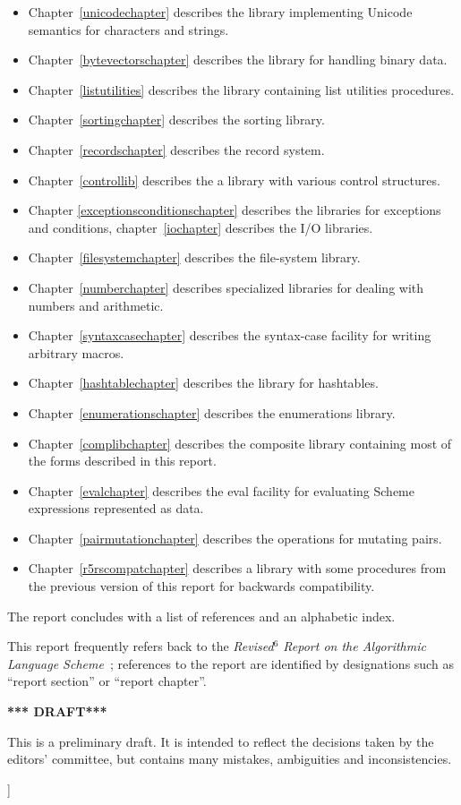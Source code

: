 \documentclass[twoside,twocolumn]{algol60}
\begin{document}
{\begin{itemize}
\item 
Chapter~\ref{unicodechapter} describes the library implementing Unicode
semantics for characters and strings.
\item Chapter~\ref{bytevectorschapter}
describes the library for handling binary data.
\item 
Chapter~\ref{listutilities} describes the library containing list utilities
procedures.
\item Chapter~\ref{sortingchapter} describes the sorting
library.
\item Chapter~\ref{recordschapter} describes the record system.
\item
Chapter~\ref{controllib} describes the a library with various
control structures.
\item Chapter \ref{exceptionsconditionschapter} describes the libraries for
exceptions and conditions, chapter~\ref{iochapter} describes the I/O
libraries.
\item Chapter~\ref{filesystemchapter} describes the file-system library.
\item 
Chapter~\ref{numberchapter} describes specialized libraries
for dealing with numbers and arithmetic.
\item 
Chapter~\ref{syntaxcasechapter} describes the {\cf syntax-case}
facility for writing arbitrary macros.
\item Chapter~\ref{hashtablechapter}
describes the library for hashtables.
\item 
Chapter~\ref{enumerationschapter} describes the enumerations library.
\item Chapter~\ref{complibchapter} describes the composite library
containing most of the forms described in this report.
\item 
Chapter~\ref{evalchapter} describes the {\cf eval} facility for
evaluating Scheme expressions represented as data.
\item 
Chapter~\ref{pairmutationchapter} describes the operations for
mutating pairs.
\item Chapter~\ref{r5rscompatchapter} describes a library
with some procedures from the previous
version of this report for backwards compatibility.
\end{itemize}

The report concludes with a list of references and an
alphabetic index.

This report frequently refers back to the \textit{Revised$^6$ Report
  on the Algorithmic Language Scheme}~\cite{R6RS}; references to the
report are identified by designations such as ``report section'' or
``report chapter''.

\bigskip

\begin{center}
{\large \bf
*** DRAFT*** \\
}\end{center}

This is a preliminary draft.  It is intended to reflect the decisions
taken by the editors' committee, but contains many mistakes,
ambiguities and inconsistencies.

}]
\end{document}
